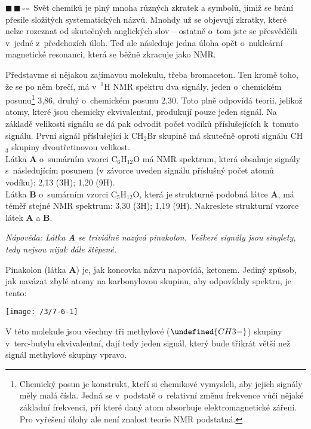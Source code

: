 \documentclass{book}
\let\ch\undefined
\newcommand{\dva}{$\blacksquare \, \blacksquare \, \square \, \square \; \; $}
\renewenvironment{quotation}{\par}{\par} %
\begin{document}
\hrulefill %
\begin{quotation}
\dva Svět chemiků je plný mnoha různých zkratek a symbolů, jimiž se brání
přesile složitých systematických názvů. Mnohdy už se objevují zkratky,
které nelze rozeznat od skutečných anglických slov -- ostatně o~tom
jste se přesvědčili v~jedné z~předchozích úloh. Teď ale následuje
jedna úloha opět o~nukleární magnetické resonanci, která se běžně
zkracuje jako NMR.

Představme si nějakou zajímavou molekulu, třeba bromaceton.
Ten kromě toho, že se po něm brečí, má v~$^{1}$H NMR spektru dva
signály, jeden o~chemickém posunu\footnote{Chemický posun je konstrukt, kteří si chemikové vymysleli, aby jejich signály měly malá čísla. Jedná se v~podstatě o~relativní změnu frekvence vůči nějaké základní frekvenci, při které daný atom absorbuje elektromagnetické záření. Pro vyřešení úlohy ale není znalost teorie NMR podstatná.} 3,86, druhý o~chemickém posunu 2,30. Toto plně odpovídá
teorii, jelikož atomy, které jsou chemicky ekvivalentní, produkují
pouze jeden signál. Na základě velikosti signálu se dá pak odvodit
počet vodíků příslušejících k~tomuto signálu. První signál příslušející
k CH$_{2}$Br skupině má skutečně oproti signálu CH$_{3}$ skupiny
dvoutřetinovou velikost.\\Látka \textbf{A} o~sumárním vzorci C$_{6}$H$_{12}$O
má NMR spektrum, která obsahuje signály s~následujícím posunem (v závorce uveden signálu příslušný počet atomů vodíku): 2,13 (3H); 1,20 (9H).\\Látka \textbf{B} o~sumárním vzorci C$_{5}$H$_{12}$O,
která je strukturně podobná látce \textbf{A}, má téměř stejné NMR
spektrum: 3,30 (3H); 1,19 (9H). Nakreslete strukturní
vzorce látek \textbf{A} a \textbf{B}.

\textit{Nápověda: Látka }\textbf{\textit{A}}\textit{ se triviálně
nazývá pinakolon. Veškeré signály jsou singlety, tedy nejsou nijak dále štěpené.}
\end{quotation} \dotfill \par 
Pinakolon (látka \textbf{A}) je, jak koncovka názvu napovídá, ketonem.
Jediný způsob, jak navázat zbylé atomy na karbonylovou skupinu, aby
odpovídaly spektru, je tento:

\begin{center}
\texttt{[image: /3/7-6-1]}
\end{center}
V této molekule jsou všechny tři methylové ($\ch{CH3 -}$) skupiny v~terc-butylu ekvivalentní, dají tedy jeden signál, který bude třikrát větší než signál methylové skupiny vpravo.
\newpage %
\end{document}
